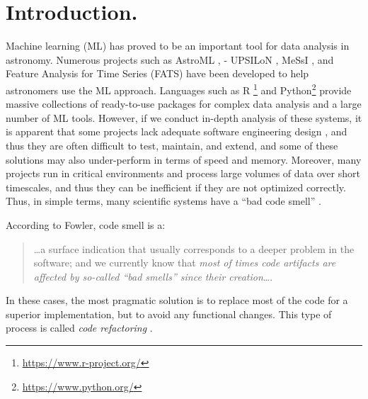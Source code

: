 \documentclass[final,5p,times,twocolumn,authoryear]{elsarticle}
\begin{document}
\section{Introduction.}
\label{section:intro}
%
Machine learning (ML) has proved to be an important tool for data 
analysis in astronomy. Numerous projects such as AstroML \citep{vanderplas_astroml:_2014}, -
UPSILoN \citep{kim_package_2016}, MeSsI \citep{de_los_rios_messi_2016}, and Feature Analysis for Time Series (FATS)\citep{nun2015fats} have been developed to 
help astronomers use the ML approach.
%
Languages such as R \footnote{\url{https://www.r-project.org/}} and Python\footnote{\url{https://www.python.org/}} provide massive collections of ready-to-use
packages for complex data analysis and a large number of ML tools. 
%
However, if we conduct in-depth analysis of these systems,
it is apparent that some projects lack adequate software engineering design \citep{cowling_first_1998}, 
and thus they are often difficult to test, maintain, and extend, 
and some of these solutions may also under-perform in terms of speed and memory. 
%
Moreover, many projects run in critical environments and process large 
volumes of data over short timescales, and thus they can be inefficient if they are
not optimized correctly. 
Thus, in simple terms, many scientific systems have a ``bad code smell'' \citep{tufano_when_2015}.

According to Fowler, code smell is a: 
\begin{quotation}
 \dots a surface indication that usually 
corresponds to a deeper problem in the software; and we currently 
know that \textit{most of times code artifacts are affected by so-called 
``bad smells'' since their creation}\dots  \citep{fowler_martin_codesmell_2006}. 
\end{quotation}
%
In these cases, the most pragmatic solution is to replace most of the 
code for a superior implementation, but to avoid any functional changes.
This type of process is called \textit{code refactoring} \citep{fowler_refactoring:_1999}.
 
\end{document}

